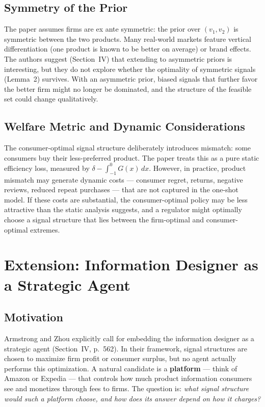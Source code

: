 \documentclass[12pt, a4paper]{article}
\begin{document}
\subsection{Symmetry of the Prior}

The paper assumes firms are ex ante symmetric: the prior over $(v_1, v_2)$ is symmetric between the two products. Many real-world markets feature vertical differentiation (one product is known to be better on average) or brand effects. The authors suggest (Section~IV) that extending to asymmetric priors is interesting, but they do not explore whether the optimality of symmetric signals (Lemma~2) survives. With an asymmetric prior, biased signals that further favor the better firm might no longer be dominated, and the structure of the feasible set could change qualitatively.

\subsection{Welfare Metric and Dynamic Considerations}

The consumer-optimal signal structure deliberately introduces mismatch: some consumers buy their less-preferred product. The paper treats this as a pure static efficiency loss, measured by $\delta - \int_{-1}^{0} G(x)\,dx$. However, in practice, product mismatch may generate dynamic costs --- consumer regret, returns, negative reviews, reduced repeat purchases --- that are not captured in the one-shot model. If these costs are substantial, the consumer-optimal policy may be less attractive than the static analysis suggests, and a regulator might optimally choose a signal structure that lies between the firm-optimal and consumer-optimal extremes.


\section{Extension: Information Designer as a Strategic Agent}

\subsection{Motivation}

Armstrong and Zhou explicitly call for embedding the information designer as a strategic agent (Section~IV, p.~562). In their framework, signal structures are chosen to maximize firm profit or consumer surplus, but no agent actually performs this optimization. A natural candidate is a \textbf{platform} --- think of Amazon or Expedia --- that controls how much product information consumers see and monetizes through fees to firms. The question is: \emph{what signal structure would such a platform choose, and how does its answer depend on how it charges?}
\end{document}
